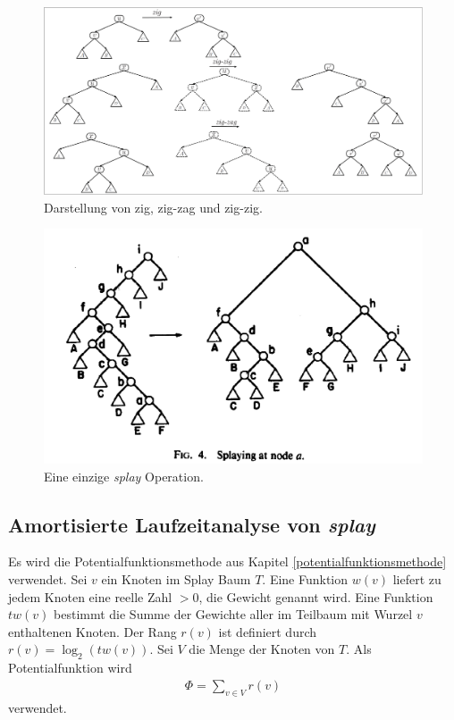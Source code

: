 \documentclass[a4paper,12pt]{article}
\begin{document}
\begin{figure}[H]
	\centering
	\includegraphics[width= 1.2\textwidth]{"Medien/Splaybaum/zigZag"}
	\caption{Darstellung von zig, zig-zag und zig-zig. }
	\label{fig:zigZag}
\end{figure}
\begin{figure}[H]
	\centering
	\includegraphics[width= 1\textwidth]{"Medien/Splaybaum/splay"}
	\caption{Eine einzige \textit{splay } Operation.\cite{splay}}
	\label{fig:splay}
\end{figure}

\subsection{Amortisierte Laufzeitanalyse von \textit{splay }}
Es wird die Potentialfunktionsmethode aus Kapitel \ref{potentialfunktionsmethode} verwendet. Sei $v$ ein Knoten im Splay Baum $T$. Eine Funktion $w\left(v\right)$ liefert zu jedem Knoten eine reelle Zahl $>0$, die Gewicht genannt wird. Eine Funktion $\mathit{tw}\left(v\right)$ bestimmt die Summe der Gewichte aller im Teilbaum mit Wurzel $v$ enthaltenen Knoten. Der Rang  $r\left(v\right)$ ist definiert durch $r\left(v\right) = \log_2 \left( \mathit{tw}\left(v\right)\right)$. Sei $V$ die Menge der Knoten von $T$. Als Potentialfunktion wird 
\begin{align*}
\Phi = \sum_{v \in V} r\left(v\right)
\end{align*}
verwendet.
\end{document}

